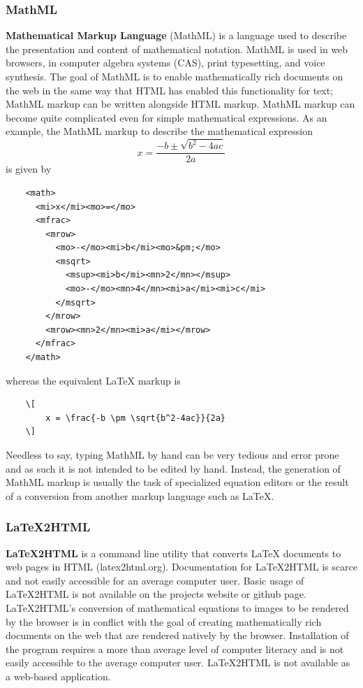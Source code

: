 \documentclass[11pt]{article}
\begin{document}
\subsubsection{MathML}
\textbf{Mathematical Markup Language} (MathML) is a language used to describe the presentation and content of mathematical notation.  MathML is used in web browsers, in computer algebra systems (CAS), print typesetting, and voice synthesis.  The goal of MathML is to enable mathematically rich documents on the web in the same way that HTML has enabled this functionality for text; MathML markup can be written alongside HTML markup.  MathML markup can become quite complicated even for simple mathematical expressions.  As an example, the MathML markup to describe the mathematical expression
\[
x = \frac{-b \pm\sqrt{b^2-4ac}}{2a}
\]
is given by
\begin{verbatim}
    <math>
      <mi>x</mi><mo>=</mo>
      <mfrac>
        <mrow>
          <mo>-</mo><mi>b</mi><mo>&pm;</mo>
          <msqrt>
            <msup><mi>b</mi><mn>2</mn></msup>
            <mo>-</mo><mn>4</mn><mi>a</mi><mi>c</mi>
          </msqrt>
        </mrow>
        <mrow><mn>2</mn><mi>a</mi></mrow>
      </mfrac>
    </math>
\end{verbatim}
whereas the equivalent LaTeX markup is
\begin{verbatim}
    \[
        x = \frac{-b \pm \sqrt{b^2-4ac}}{2a}
    \]
\end{verbatim}
Needless to say, typing MathML by hand can be very tedious and error prone and as such it is not intended to be edited by hand.  Instead, the generation of MathML markup is usually the task of specialized equation editors or the result of a conversion from another markup language such as LaTeX.
 
\subsubsection{LaTeX2HTML}
\textbf{LaTeX2HTML} is a command line utility that converts LaTeX documents to web pages in HTML (latex2html.org).  Documentation for LaTeX2HTML is scarce and not easily accessible for an average computer user.  Basic usage of LaTeX2HTML is not available on the projects website or github page. LaTeX2HTML's conversion of mathematical equations to images to be rendered by the browser is in conflict with the goal of creating mathematically rich documents on the web that are rendered natively by the browser.  Installation of the program requires a more than average level of computer literacy and is not easily accessible to the average computer user.  LaTeX2HTML is not available as a web-based application.
\end{document}
